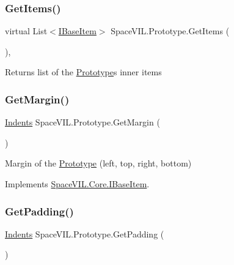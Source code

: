 \subsubsection{\texorpdfstring{Get\+Items()}{GetItems()}}
{\footnotesize\ttfamily virtual List$<$\mbox{\hyperlink{interface_space_v_i_l_1_1_core_1_1_i_base_item}{I\+Base\+Item}}$>$ Space\+V\+I\+L.\+Prototype.\+Get\+Items (\begin{DoxyParamCaption}{ }\end{DoxyParamCaption})\hspace{0.3cm}{\ttfamily [inline]}, {\ttfamily [virtual]}}



Returns list of the \mbox{\hyperlink{class_space_v_i_l_1_1_prototype}{Prototype}}\textquotesingle{}s inner items 

\mbox{\label{class_space_v_i_l_1_1_prototype_aff828c5a3ba3253b301f93ecdb8e4876}} 
\subsubsection{\texorpdfstring{Get\+Margin()}{GetMargin()}}
{\footnotesize\ttfamily \mbox{\hyperlink{struct_space_v_i_l_1_1_decorations_1_1_indents}{Indents}} Space\+V\+I\+L.\+Prototype.\+Get\+Margin (\begin{DoxyParamCaption}{ }\end{DoxyParamCaption})\hspace{0.3cm}{\ttfamily [inline]}}



Margin of the \mbox{\hyperlink{class_space_v_i_l_1_1_prototype}{Prototype}} (left, top, right, bottom) 



Implements \mbox{\hyperlink{interface_space_v_i_l_1_1_core_1_1_i_base_item}{Space\+V\+I\+L.\+Core.\+I\+Base\+Item}}.

\mbox{\label{class_space_v_i_l_1_1_prototype_a861ce67e320359dc1bf36a68b2a039b4}} 
\subsubsection{\texorpdfstring{Get\+Padding()}{GetPadding()}}
{\footnotesize\ttfamily \mbox{\hyperlink{struct_space_v_i_l_1_1_decorations_1_1_indents}{Indents}} Space\+V\+I\+L.\+Prototype.\+Get\+Padding (\begin{DoxyParamCaption}{ }\end{DoxyParamCaption})\hspace{0.3cm}{\ttfamily [inline]}}



